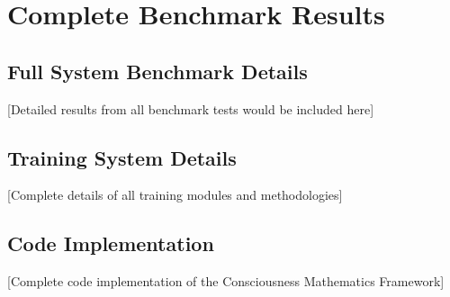 \documentclass[12pt,a4paper]{article}
\begin{document}
\appendix

\section{Complete Benchmark Results}

\subsection{Full System Benchmark Details}

[Detailed results from all benchmark tests would be included here]

\subsection{Training System Details}

[Complete details of all training modules and methodologies]

\subsection{Code Implementation}

[Complete code implementation of the Consciousness Mathematics Framework]
\end{document}
